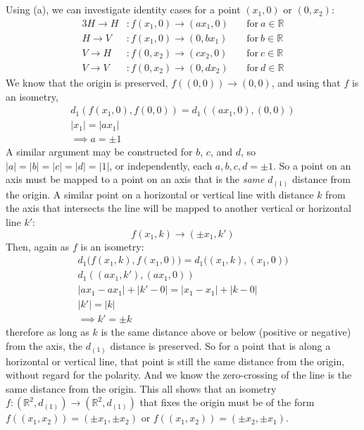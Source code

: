 \documentclass{jhwhw}
\begin{document}
\part{}
Using (a), we can investigate identity cases for a point $(x_1,0)$ or $(0,x_2)$:
\begin{alignat}{3}
H\to H&: f(x_1,0) \to (ax_1,0) \: &&\text{for} \: a \in \mathbb{R}\\
H \to V&: f(x_1,0) \to (0,bx_1) \: &&\text{for} \: b \in \mathbb{R}\\
V \to H&: f(0,x_2) \to (cx_2,0) \: &&\text{for} \: c \in \mathbb{R}\\
V \to V&: f(0,x_2) \to (0,dx_2) \: &&\text{for} \: d \in \mathbb{R}
\end{alignat}
We know that the origin is preserved, $f((0,0)) \to (0,0)$, and using that $f$ is an isometry, 
\begin{gather}
d_1(f(x_1,0),f(0,0)) = d_1((ax_1,0),(0,0))\\
|x_1|= |ax_1| \\
\implies a = \pm 1
\end{gather}
A similar argument may be constructed for $b$, $c$, and $d$, so $|a|=|b|=|c|=|d|=|1|$, or independently, each $a,b,c,d = \pm 1$. So a point on an axis must be mapped to a point on an axis that is the \textit{same} $d_{(1)}$ distance from the origin. A similar point on a horizontal or vertical line with distance $k$ from the axis that intersects the line will be mapped to another vertical or horizontal line $k'$:
\begin{equation}
f(x_1,k) \to (\pm x_1,k')
\end{equation}
Then, again as $f$ is an isometry:
\begin{gather}
d_1\big(f(x_1,k),f(x_1,0)\big)=d_1\big((x_1,k),(x_1,0)\big)\\
d_1(( ax_1,k'),(ax_1,0)) \\
|ax_1 - ax_1| + |k' - 0| = |x_1 - x_1| + |k - 0|\\
|k'| = |k|\\
\implies k'=\pm k
\end{gather}
therefore as long as $k$ is the same distance above or below (positive or negative) from the axis, the $d_{(1)}$ distance is preserved. So for a point that is along a horizontal or vertical line, that point is still the same distance from the origin, without regard for the polarity. And we know the zero-crossing of the line is the same distance from the origin. This all shows that an isometry  $f:(\mathbb{R}^2,d_{(1)})\to (\mathbb{R}^2,d_{(1)})$ that fixes the origin must be of the form $f((x_1,x_2) )= (\pm x_1,\pm x_2)$ or $f((x_1,x_2)) = (\pm x_2, \pm x_1)$.
\end{document}
